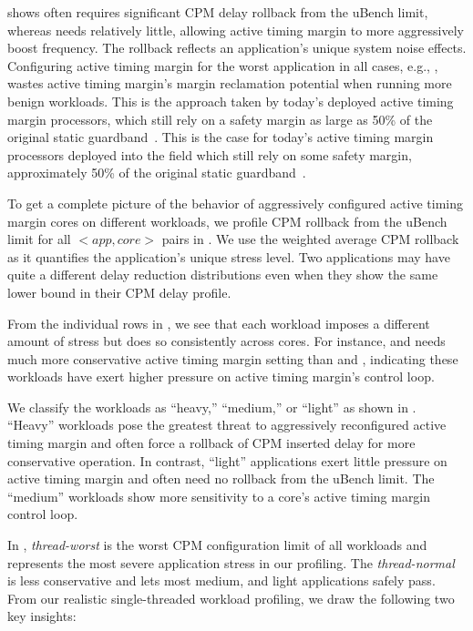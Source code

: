  shows  often requires significant CPM delay rollback from the uBench limit, whereas  needs relatively little, allowing active timing margin to more aggressively boost frequency. The rollback reflects an application's unique system noise effects. Configuring active timing margin for the worst application in all cases, e.g., , wastes active timing margin's margin reclamation potential when running more benign workloads. This is the approach taken by today's deployed active timing margin processors, which still rely on a safety margin as large as 50\% of the original static guardband~\cite{lefurgy2011active}. This is the case for today's active timing margin processors deployed into the field which still rely on some safety margin, approximately 50\% of the original static guardband~\cite{lefurgy2011active}.

To get a complete picture of the behavior of aggressively configured active timing margin cores on different workloads, we profile CPM rollback from the uBench limit for all $<app, core>$ pairs in . We use the weighted average CPM rollback as it quantifies the application's unique stress level. Two applications may have quite a different delay reduction distributions even when they show the same lower bound in their CPM delay profile. 

From the individual rows in , we see that each workload imposes a different amount of stress but does so consistently across cores. For instance,  and  needs much more conservative active timing margin setting than  and , indicating these workloads have exert higher pressure on active timing margin's control loop.

We classify the workloads as ``heavy,'' ``medium,'' or ``light'' as shown in . ``Heavy'' workloads pose the greatest threat to aggressively reconfigured active timing margin and often force a rollback of CPM inserted delay for more conservative operation. In contrast, ``light'' applications exert little pressure on active timing margin and often need no rollback from the uBench limit. The ``medium'' workloads show more sensitivity to a core's active timing margin control loop.

In , \textit{thread-worst} is the worst CPM configuration limit of all workloads and represents the most severe application stress in our profiling. The \textit{thread-normal} is less conservative and lets most medium, and light applications safely pass. From our realistic single-threaded workload profiling, we draw the following two key insights:


